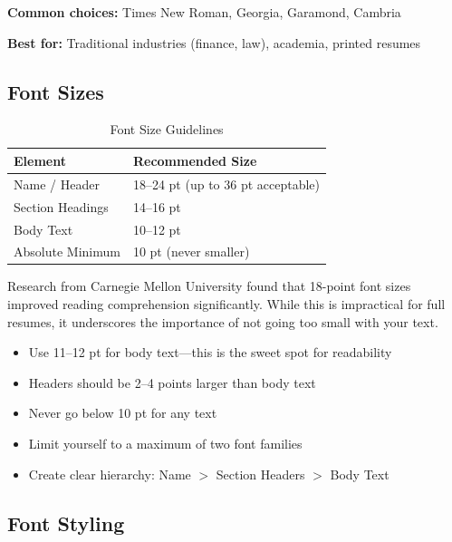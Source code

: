 \documentclass[11pt,a4paper]{article}
\begin{document}
\textbf{Common choices:} Times New Roman, Georgia, Garamond, Cambria

\textbf{Best for:} Traditional industries (finance, law), academia, printed resumes

\subsection{Font Sizes}

\begin{table}[h]
\centering
\begin{tabular}{@{}ll@{}}
\toprule
\textbf{Element} & \textbf{Recommended Size} \\
\midrule
Name / Header & 18--24 pt (up to 36 pt acceptable) \\
Section Headings & 14--16 pt \\
Body Text & 10--12 pt \\
Absolute Minimum & 10 pt (never smaller) \\
\bottomrule
\end{tabular}
\caption{Font Size Guidelines}
\end{table}

\begin{keystat}
Research from Carnegie Mellon University found that 18-point font sizes improved reading comprehension significantly. While this is impractical for full resumes, it underscores the importance of not going too small with your text.
\end{keystat}

\begin{bestpractice}
\begin{itemize}[noitemsep]
    \item Use 11--12 pt for body text---this is the sweet spot for readability
    \item Headers should be 2--4 points larger than body text
    \item Never go below 10 pt for any text
    \item Limit yourself to a maximum of two font families
    \item Create clear hierarchy: Name $>$ Section Headers $>$ Body Text
\end{itemize}
\end{bestpractice}

\subsection{Font Styling}
\end{document}
